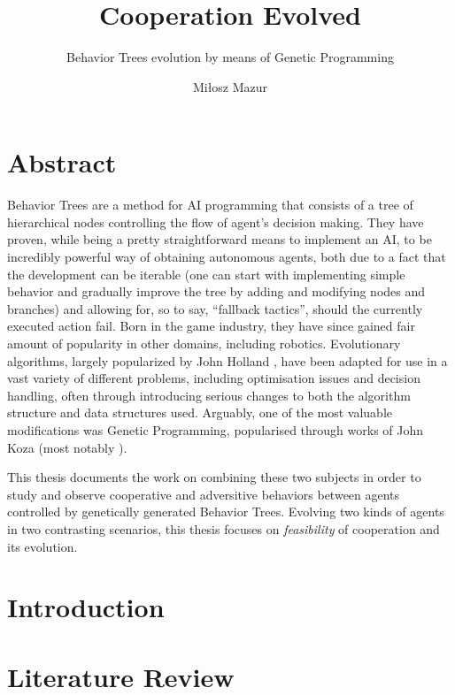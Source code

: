 \documentclass[12pt]{scrreprt}
\begin{document}
\author{Miłosz Mazur}
\title{Cooperation Evolved}
\subtitle{Behavior Trees evolution by means of Genetic Programming}
\maketitle

\newpage
\chapter*{Abstract}
Behavior Trees are a method for AI programming that consists of a tree of hierarchical nodes controlling the flow of agent's decision making. They have proven, while being a pretty straightforward means to implement an AI, to be incredibly powerful way of obtaining autonomous agents, both due to a fact that the development can be iterable (one can start with implementing simple behavior and gradually improve the tree by adding and modifying nodes and branches) and allowing for, so to say, ``fallback tactics'', should the currently executed action fail.  Born in the game industry, they have since gained fair amount of popularity in other domains, including robotics.
Evolutionary algorithms, largely popularized by John Holland \cite{hollandadaptation}, have been adapted for use in a vast variety of different problems, including optimisation issues and decision handling, often through introducing serious changes to both the algorithm structure and data structures used. Arguably, one of the most valuable modifications was Genetic Programming, popularised through works of John Koza (most notably \cite{kozagp}).

This thesis documents the work on combining these two subjects in order to study and observe cooperative and adversitive behaviors between agents controlled by genetically generated Behavior Trees. Evolving two kinds of agents in two contrasting scenarios, this thesis focuses on \textit{feasibility} of cooperation and its evolution.  %

\tableofcontents
\chapter{Introduction}


\chapter{Literature Review}

\end{document}
